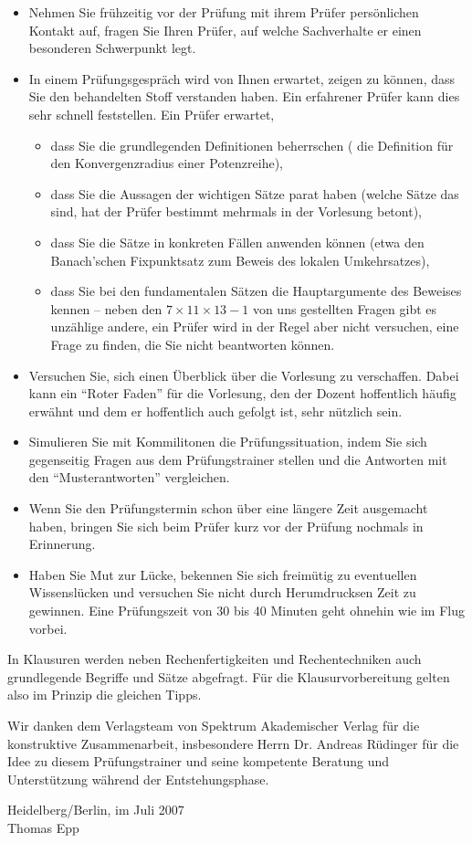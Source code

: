 \begin{itemize}
\item Nehmen Sie frühzeitig vor der Prüfung mit 
ihrem Prüfer persönlichen Kontakt auf, fragen Sie Ihren Prüfer, 
auf welche Sachverhalte er einen besonderen 
Schwerpunkt legt.
\item In einem Prüfungsgespräch wird von Ihnen erwartet, zeigen zu 
können, dass 
Sie den behandelten Stoff verstanden haben. Ein erfahrener Prüfer kann dies 
sehr schnell feststellen. Ein Prüfer erwartet,
\begin{itemize}
\item dass Sie die grundlegenden Definitionen 
beherrschen ({\zB} die Definition 
für den Konvergenzradius einer Potenzreihe),
\item dass Sie die Aussagen der wichtigen Sätze parat haben 
(welche Sätze das sind, hat der Prüfer bestimmt mehrmals in der 
Vorlesung betont),
\item dass Sie die Sätze in konkreten Fällen anwenden können (etwa den 
Banach'schen Fixpunktsatz zum Beweis des lokalen Umkehrsatzes),
\item 
dass Sie bei den fundamentalen Sätzen die Hauptargumente des Beweises kennen
 -- neben den $7\times 11\times 13 -1$ von uns gestellten Fragen 
gibt es unzählige andere, 
ein Prüfer wird in der Regel aber nicht versuchen, eine Frage zu finden, die 
Sie nicht beantworten können.
\end{itemize}
\item Versuchen Sie, sich einen Überblick über die Vorlesung zu 
verschaffen. Dabei 
kann ein "`Roter Faden"' für die Vorlesung, den der Dozent 
hoffentlich häufig erwähnt und dem er hoffentlich auch gefolgt ist, sehr 
nützlich sein.
\item Simulieren Sie mit Kommilitonen die Prüfungssituation, indem Sie sich 
gegenseitig Fragen aus dem Prüfungstrainer stellen und die Antworten mit 
den "`Musterantworten"' vergleichen.
\item Wenn Sie den Prüfungstermin schon über eine längere Zeit 
ausgemacht haben, bringen Sie sich beim Prüfer kurz vor der Prüfung 
nochmals in Erinnerung.
\item Haben Sie Mut zur Lücke, bekennen Sie sich freimütig zu eventuellen 
Wissenslücken und versuchen Sie nicht durch Herumdrucksen Zeit zu gewinnen.
Eine Prüfungszeit von 30 bis 40 Minuten geht ohnehin wie im Flug vorbei.
\end{itemize}
In Klausuren werden neben Rechenfertigkeiten und Rechentechniken auch 
grundlegende Begriffe und Sätze abgefragt. Für die Klausurvorbereitung gelten 
also im Prinzip die gleichen Tipps.

Wir danken dem Verlagsteam von Spektrum Akademischer 
Verlag für die konstruktive Zusammenarbeit, insbesondere Herrn Dr. Andreas 
Rüdinger für die Idee zu diesem Prüfungstrainer und seine kompetente Beratung 
und Unterstützung während der Entstehungsphase.

\medskip\noindent
Heidelberg/Berlin, im Juli 2007 
\\
Thomas Epp
